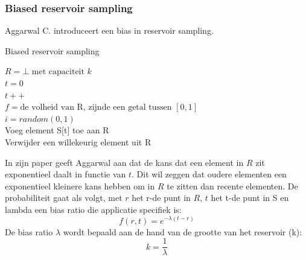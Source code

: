 \subsubsection{Biased reservoir sampling}
Aggarwal C. \cite{biased reservoir sampling} introduceert een bias in reservoir sampling.

\begin{algorithm}
\caption*{Biased reservoir sampling}
$R = \bot \text{ met capaciteit }k$\\
$t=0$\\
{
$t++$\\
$f=\text{de volheid van R, zijnde een getal tussen }[0,1]$\\
$i = random(0,1)$\\
Voeg element S[t] toe aan R\\
{Verwijder een willekeurig element uit R}
}
\end{algorithm}
\noindent In zijn paper geeft Aggarwal aan dat de kans dat een element in $R$ zit exponentieel daalt in functie van $t$. Dit wil zeggen dat oudere elementen een exponentieel kleinere kans hebben om in $R$ te zitten dan recente elementen. De probabiliteit gaat als volgt, met $r$ het r-de punt in $R$, $t$ het t-de punt in S en \gls{lambda} een bias ratio die applicatie specifiek is:
\[f(r,t)=e^{-\lambda(t-r)}\]
De bias ratio $\lambda$ wordt bepaald aan de hand van de grootte van het reservoir (k):
\[k=\frac{1}{\lambda}\]

